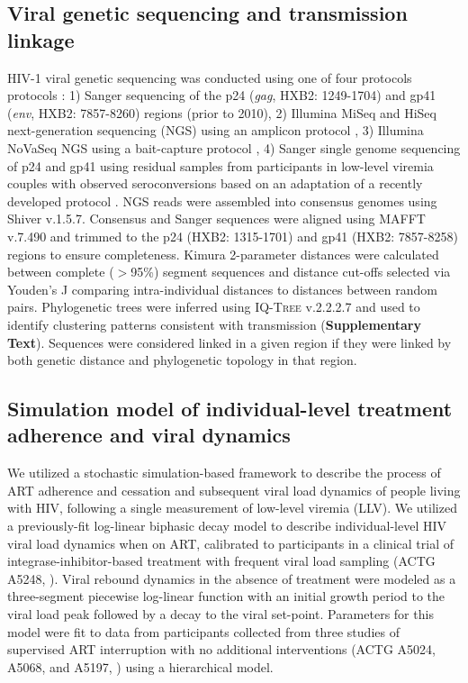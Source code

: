 \documentclass{article}[11pt]
\begin{document}
\subsection*{Viral genetic sequencing and transmission linkage}
HIV-1 viral genetic sequencing was conducted using one of four protocols protocols \cite{kim2024}: 1) Sanger sequencing of the p24 (\textit{gag}, HXB2: 1249-1704) and gp41 (\textit{env}, HXB2: 7857-8260) regions (prior to 2010), 2) Illumina MiSeq and HiSeq next-generation sequencing (NGS) using an amplicon protocol \cite{gall2012}, 3) Illumina NoVaSeq NGS using a bait-capture protocol \cite{bonsall2020}, 4) Sanger single genome sequencing of p24 and gp41 using residual samples from participants in low-level viremia couples with observed seroconversions based on an adaptation of a recently developed protocol \cite{box2026}. NGS reads were assembled into consensus genomes using Shiver v.1.5.7. Consensus and Sanger sequences were aligned using \textsc{MAFFT} v.7.490 and trimmed to the p24 (HXB2: 1315-1701) and gp41 (HXB2: 7857-8258) regions to ensure completeness. Kimura 2-parameter distances were calculated between complete ($>$95\%) segment sequences and distance cut-offs selected via Youden's J comparing intra-individual distances to distances between random pairs. Phylogenetic trees were inferred using \textsc{IQ-Tree} v.2.2.2.7 and used to identify clustering patterns consistent with transmission (\textbf{Supplementary Text}). Sequences were considered linked in a given region if they were linked by both genetic distance and phylogenetic topology in that region. 


\subsection*{Simulation model of individual-level treatment adherence and viral dynamics}

We utilized a stochastic simulation-based framework to describe the process of ART adherence and cessation and subsequent viral load dynamics of people living with HIV, following a single measurement of low-level viremia (LLV). We utilized a previously-fit log-linear biphasic decay model to describe individual-level HIV viral load dynamics when on ART, calibrated to participants in a clinical trial of integrase-inhibitor-based treatment with frequent viral load sampling (ACTG A5248, \cite{andrade2013}). Viral rebound dynamics in the absence of treatment were modeled as a three-segment piecewise log-linear function with an initial growth period to the viral load peak followed by a decay to the viral set-point. Parameters for this model were fit to data from participants collected from three studies of supervised ART interruption with no additional interventions (ACTG A5024, A5068, and A5197, \cite{li_size_2016}) using a hierarchical model. 
\end{document}
